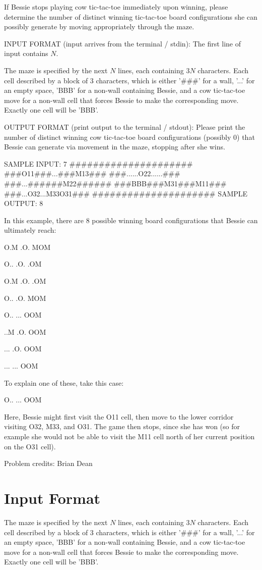 \documentclass[12pt]{article}
\begin{document}
If Bessie stops playing cow tic-tac-toe immediately upon winning, please 
determine the number of distinct winning tic-tac-toe board configurations she
can possibly generate by moving appropriately through the maze.

INPUT FORMAT (input arrives from the terminal / stdin):
The first line of input contains $N$.

The maze is specified by the next $N$ lines, each containing $3N$ characters. 
Each cell described by a block of 3 characters, which is either '###' for a
wall, '...' for an empty space, 'BBB' for a non-wall containing Bessie, and a
cow tic-tac-toe move for a non-wall cell that forces Bessie to make the
corresponding move.  Exactly one cell will be 'BBB'.

OUTPUT FORMAT (print output to the terminal / stdout):
Please print the number of distinct winning cow tic-tac-toe board configurations
(possibly 0) that Bessie can generate via movement in the maze, stopping after
she wins.

SAMPLE INPUT:
7
#####################
###O11###...###M13###
###......O22......###
###...######M22######
###BBB###M31###M11###
###...O32...M33O31###
#####################
SAMPLE OUTPUT: 
8

In this example, there are 8 possible winning board configurations that Bessie
can ultimately reach:


O.M
.O.
MOM

O..
.O.
.OM

O.M
.O.
.OM

O..
.O.
MOM

O..
...
OOM

..M
.O.
OOM

...
.O.
OOM

...
...
OOM

To explain one of these, take this case:

O..
...
OOM

Here, Bessie might first visit the O11 cell, then move to the lower corridor
visiting O32, M33, and O31.  The game then stops, since she has won (so for
example she would not be able to visit the M11 cell north of her current
position on the O31 cell). 


Problem credits: Brian Dean



\section*{Input Format}
The maze is specified by the next $N$ lines, each containing $3N$ characters. 
Each cell described by a block of 3 characters, which is either '###' for a
wall, '...' for an empty space, 'BBB' for a non-wall containing Bessie, and a
cow tic-tac-toe move for a non-wall cell that forces Bessie to make the
corresponding move.  Exactly one cell will be 'BBB'.
\end{document}
